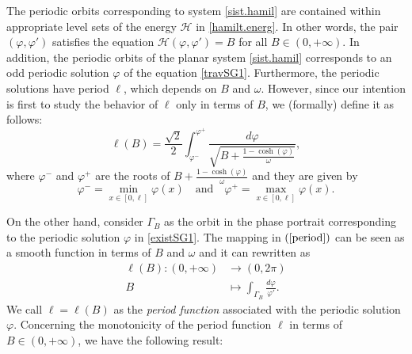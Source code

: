 \documentclass[12pt,reqno,a4paper]{amsart} %
\numberwithin{equation}{section}
\numberwithin{figure}{section}
\begin{document}
 	The periodic orbits corresponding to system \eqref{sist.hamil} are contained within appropriate level sets of the energy $	\mathcal{H}$ in \eqref{hamilt.energ}. In other words, the pair $(\varphi, \varphi')$
 	satisfies the equation $	\mathcal{H}(\varphi, \varphi')=B$ for all $B\in (0,+\infty)$. In addition, the periodic orbits of the planar system \eqref{sist.hamil} corresponds to an odd periodic solution $\varphi$ of the equation \eqref{travSG1}. Furthermore, the periodic solutions have period $\ell$, which depends on $B$ and $\omega$. However, since our intention is first to study the behavior of $\ell$ only in terms of $B$, we 
 	(formally) define it as follows:
 	\begin{equation}\label{period}
 		\ell(B)=\frac{\sqrt{2} }{2} \displaystyle \int_{\varphi ^-}^{\varphi^+}\frac{d\varphi}{\sqrt{B+\frac{1-\cosh(\varphi )}{\omega}}},
 	\end{equation} 
 	where $\varphi^{-}$ and $\varphi^{+}$ are the roots of $ B+\frac{1-\cosh(\varphi )}{\omega}$ and they are  given by  $$\varphi ^-=\displaystyle\min_{x\in[0,\ell]}\varphi (x) \quad \text{and} \quad\varphi ^+=\displaystyle\max_{x\in[0,\ell]}\varphi (x).$$  
 	
 	\indent On the other hand, consider $\Gamma_B$ as the orbit in the phase portrait corresponding to the periodic solution $\varphi$ in \eqref{existSG1}.  
 	The mapping in $(\ref{period})$ can be seen as a smooth function in terms of $B$ and $\omega$ and it can rewritten as
 	\begin{align}\label{period.function}
 	 \ell(B):(0,+\infty)&\rightarrow (0,2\pi) \nonumber\\ B \ \ &\mapsto \displaystyle\int_{\Gamma_B} \frac{d\varphi }{\varphi '}.
 	\end{align} We call $\ell=\ell(B)$ as the \textit{period function} associated with the periodic solution $\varphi$. Concerning the monotonicity of the period function $\ell$ in terms of $B\in (0,+\infty)$, we have the following result:
 	
\end{document}
